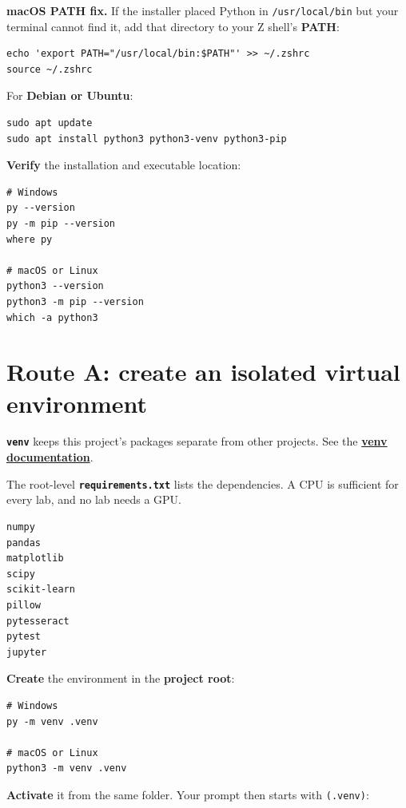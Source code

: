 \textbf{macOS PATH fix.} If the installer placed Python in \texttt{/usr/local/bin} but your terminal cannot find it, add that directory to your Z shell's \textbf{PATH}:

\begin{lstlisting}[style=utpterminal]
echo 'export PATH="/usr/local/bin:$PATH"' >> ~/.zshrc
source ~/.zshrc
\end{lstlisting}

For \textbf{Debian or Ubuntu}:

\begin{lstlisting}[style=utpterminal]
sudo apt update
sudo apt install python3 python3-venv python3-pip
\end{lstlisting}

\textbf{Verify} the installation and executable location:

\begin{lstlisting}[style=utpterminal]
# Windows
py --version
py -m pip --version
where py

# macOS or Linux
python3 --version
python3 -m pip --version
which -a python3
\end{lstlisting}

\section{Route A: create an isolated virtual environment}

\textbf{\texttt{venv}} keeps this project's packages separate from other projects. See the \href{https://docs.python.org/3/library/venv.html}{\textbf{venv documentation}}.

The root-level \textbf{\texttt{requirements.txt}} lists the dependencies. A CPU is sufficient for every lab, and no lab needs a GPU.

\begin{lstlisting}[style=utpterminal]
numpy
pandas
matplotlib
scipy
scikit-learn
pillow
pytesseract
pytest
jupyter
\end{lstlisting}

\textbf{Create} the environment in the \textbf{project root}:

\begin{lstlisting}[style=utpterminal]
# Windows
py -m venv .venv

# macOS or Linux
python3 -m venv .venv
\end{lstlisting}

\textbf{Activate} it from the same folder. Your prompt then starts with \texttt{(.venv)}:

